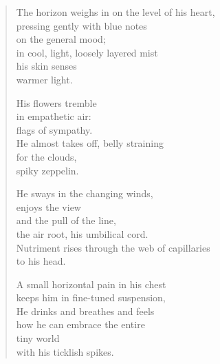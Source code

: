 \begin{verse}

The horizon weighs in on the level of his heart,\\
pressing gently with blue notes\\
on the general mood;\\
in cool, light, loosely layered mist\\
his skin senses\\
warmer light.

His flowers tremble\\
in empathetic air:\\
flags of sympathy.\\
He almost takes off, belly straining\\
for the clouds,\\
spiky zeppelin.

He sways in the changing winds,\\
enjoys the view\\
and the pull of the line,\\
the air root, his umbilical cord.\\
Nutriment rises through the web of capillaries\\
to his head.

A small horizontal pain in his chest\\
keeps him in fine-tuned suspension,\\
He drinks and breathes and feels\\
how he can embrace the entire\\
tiny world\\
with his ticklish spikes.

\end{verse}

